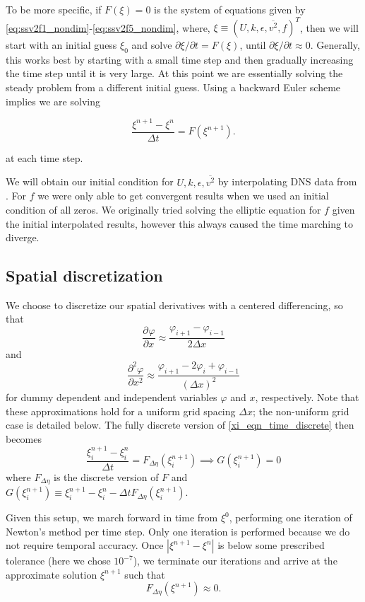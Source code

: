 \documentclass[a4paper,11pt]{article}
\newcommand{\pderiv}[3][]{%
  \ensuremath{\frac{\partial^{#1} {#2}}{\partial {#3}^{#1}}}}
\newcommand{\noi}{\noindent}
\newcommand{\ep}{\epsilon}
\begin{document}
To be more specific, if $F(\xi) = 0$ is the system of equations given by
\eqref{eq:ssv2f1_nondim}-\eqref{eq:ssv2f5_nondim}, where, $\xi \equiv (U, k,
\ep, \overline{v^2}, f)^T$, then we will start with an initial guess $\xi_0$ and
solve $\partial \xi / \partial t = F(\xi)$, until $\partial \xi / \partial t
\approx 0$. Generally, this works best by starting with a small
time step and then gradually increasing the time step until it is very large. At
this point we are essentially solving the steady problem from a
different initial guess. Using a backward Euler scheme implies we are solving 

\begin{equation}\label{xi_eqn_time_discrete}
\frac{\xi^{n+1} - \xi^n}{\Delta t} = F(\xi^{n+1}).
\end{equation}

\noi at each time step. 

We will obtain our initial condition for $U, k, \ep,
\overline{v^2}$ by interpolating DNS data from \cite{Lee}. For $f$ we were only
able to get convergent results when we used an initial condition of all zeros.
We originally tried solving the elliptic equation for $f$ given the initial
interpolated results, however this always caused the time marching to diverge.
\subsection{Spatial discretization}
We choose to discretize our spatial derivatives with a centered differencing, so that 
\[
\pderiv{\varphi}{x} \approx \frac{\varphi_{i+1}-\varphi_{i-1}}{2\Delta x} 
\]
and 
\[
\frac{\partial^2 \varphi}{\partial x^2} \approx \frac{ \varphi_{i+1} - 2\varphi_i + \varphi_{i-1} }{(\Delta x)^2} 
\]
for dummy dependent and independent variables $\varphi$ and $x$, respectively. Note that these approximations hold for a uniform grid spacing $\Delta x$; the non-uniform grid case is detailed below. The fully discrete version of \eqref{xi_eqn_time_discrete} then becomes 
\begin{equation}\label{xi_eqn_fully_discrete}
\frac{\xi_i^{n+1} - \xi_i^n}{\Delta t} = F_{\Delta \eta}(\xi_i^{n+1}) \implies G(\xi^{n+1}_i) = 0 
\end{equation}
where $F_{\Delta \eta}$ is the discrete version of $F$ and $G(\xi_i^{n+1}) \equiv \xi^{n+1}_i - \xi^n_i - \Delta t F_{\Delta \eta}(\xi_i^{n+1})$. 

Given this setup, we march forward in time from $\xi^0$, performing one
iteration of Newton's method per time step. Only one iteration is performed
because we do not require temporal accuracy. Once $|\xi^{n+1}-\xi^n|$ is below
some prescribed tolerance (here we chose $10^{-7}$), we terminate our iterations
and arrive at the approximate solution $\xi^{n+1}$ such that
\[
F_{\Delta \eta}(\xi^{n+1}) \approx 0 .
\]
\end{document}

